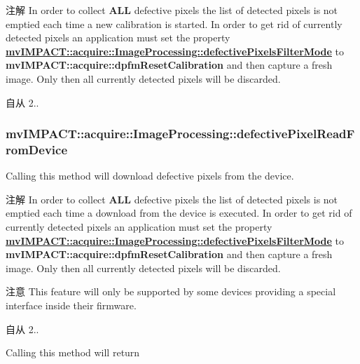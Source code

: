 \begin{DoxyNote}{注解}
In order to collect {\bfseries A\+L\+L} defective pixels the list of detected pixels is not emptied each time a new calibration is started. In order to get rid of currently detected pixels an application must set the property {\bfseries \hyperlink{classmv_i_m_p_a_c_t_1_1acquire_1_1_image_processing_ae1e060a70ed836297ef3886db0bf8a95}{mv\+I\+M\+P\+A\+C\+T\+::acquire\+::\+Image\+Processing\+::defective\+Pixels\+Filter\+Mode}} to {\bfseries mv\+I\+M\+P\+A\+C\+T\+::acquire\+::dpfm\+Reset\+Calibration} and then capture a fresh image. Only then all currently detected pixels will be discarded.
\end{DoxyNote}
\begin{DoxySince}{自从}
2.. 
\end{DoxySince}
\hypertarget{classmv_i_m_p_a_c_t_1_1acquire_1_1_image_processing_aebd10f27aaab9228b4d3d207a6b27aca}{
\subsubsection[{defective\+Pixel\+Read\+From\+Device}]{ mv\+I\+M\+P\+A\+C\+T\+::acquire\+::\+Image\+Processing\+::defective\+Pixel\+Read\+From\+Device}}\label{classmv_i_m_p_a_c_t_1_1acquire_1_1_image_processing_aebd10f27aaab9228b4d3d207a6b27aca}


Calling this method will download defective pixels from the device. 

\begin{DoxyNote}{注解}
In order to collect {\bfseries A\+L\+L} defective pixels the list of detected pixels is not emptied each time a download from the device is executed. In order to get rid of currently detected pixels an application must set the property {\bfseries \hyperlink{classmv_i_m_p_a_c_t_1_1acquire_1_1_image_processing_ae1e060a70ed836297ef3886db0bf8a95}{mv\+I\+M\+P\+A\+C\+T\+::acquire\+::\+Image\+Processing\+::defective\+Pixels\+Filter\+Mode}} to {\bfseries mv\+I\+M\+P\+A\+C\+T\+::acquire\+::dpfm\+Reset\+Calibration} and then capture a fresh image. Only then all currently detected pixels will be discarded.
\end{DoxyNote}
\begin{DoxyAttention}{注意}
This feature will only be supported by some devices providing a special interface inside their firmware.
\end{DoxyAttention}
\begin{DoxySince}{自从}
2..
\end{DoxySince}
Calling this method will return ~\newline

